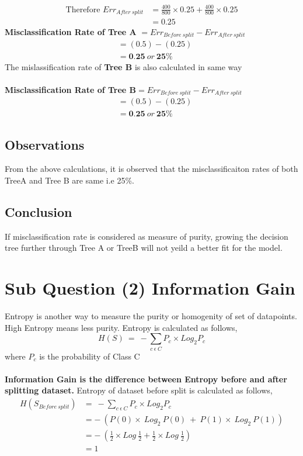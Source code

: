 \documentclass[a4paper,11pt]{article}
\newcommand\tab[1][1cm]{\hspace*{#1}}
\begin{document}
\begin{mlsolution}
\noindent
\begin{align*}
\text{Therefore\ } Err_{After\ split} &= \frac{400}{800} \times 0.25 + \frac{400}{800} \times 0.25\\
 &= 0.25
\end{align*}
\tab \textbf{Misclassification Rate of Tree A} $= Err_{Before\ split} - Err_{After\ split}$
\begin{align*}
  &=(0.5) - (0.25)\\   
  &= \textbf{0.25}\ or\ \textbf{25\%}
\end{align*}
\noindent
\tab The mislassification rate of \textbf{Tree B} is also calculated in same way\\
\\
\tab \textbf{Misclassification Rate of Tree B}$= Err_{Before\ split} - Err_{After\ split}$
\begin{align*}
  &=(0.5) - (0.25)\\   
  &= \textbf{0.25}\ or\ \textbf{25\%}
\end{align*}
\subsection*{Observations}
\tab From the above calculations, it is observed that the misclassificaiton rates of both TreeA and Tree B are same i.e 25\%. 
\subsection*{Conclusion}
\tab If misclassification rate is considered as measure of purity, growing the decision tree further through Tree A or TreeB will not yeild a better fit for the model. 

\section*{Sub Question (2)  Information Gain	}
\tab Entropy is another way to measure the purity or homogenity of set of datapoints. High Entropy means less purity. Entropy is calculated as follows,
$$H(S)\ =\ -\sum\limits_{c\  \epsilon\  C} {P_c \times Log_2 P_c}$$
\noindent
\tab \tab \tab \tab where $P_c$ is the probability of Class C\\\\
\noindent
\tab \textbf{Information Gain is the difference between Entropy before and after splitting dataset.}
Entropy of dataset before split is calculated as follows,
\begin{align*} 
  H(S_{Before\ split}) &= \ -\sum\limits_{c\  \epsilon\  C} {P_c \times Log_2 P_c}\\
  &= -\ (P(0) \times\ Log_2\ P(0)\ +\ P(1) \times\ Log_2\ P(1))\\
  &= -\ (\frac{1}{2} \times Log\ \frac{1}{2} + \frac{1}{2} \times Log\ \frac{1}{2} )\\
  &= 1
\end{align*}


\end{mlsolution}
\end{document}

